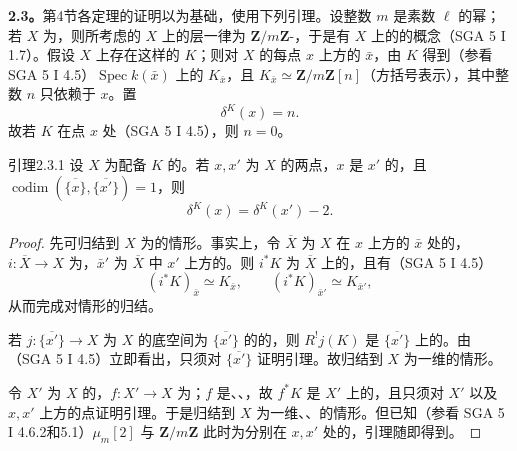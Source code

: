 \textbf{2.3。}第4节各定理的证明以为基础，使用下列引理。设整数 $m$ 是素数 $\ell$ 的幂；若 $X$ 为，则所考虑的 $X$ 上的层一律为 $\mathbf Z/m\mathbf Z$-，于是有 $X$ 上的的概念（SGA 5 I 1.7）。假设 $X$ 上存在这样的 $K$；则对 $X$ 的每点 $x$ 上方的 $\bar x$，由 $K$ 得到（参看 SGA 5 I 4.5）$\operatorname{Spec}k(\bar x)$ 上的 $K_{\bar x}$，且 $K_{\bar x}\simeq\mathbf Z/m\mathbf Z[n]$（方括号表示），其中整数 $n$ 只依赖于 $x$。置
\[\delta^K(x)=n.\]
故若 $K$ 在点 $x$ 处（SGA 5 I 4.5），则 $n=0$。
\begin{SGAresult}{引理}{2.3.1}
设 $X$ 为配备 $K$ 的。若 $x,x'$ 为 $X$ 的两点，$x$ 是 $x'$ 的，且 $\operatorname{codim}(\overline{\{x\}},\overline{\{x'\}})=1$，则
\[\delta^K(x)=\delta^K(x')-2.\]
\end{SGAresult}
\begin{proof}
先可归结到 $X$ 为的情形。事实上，令 $\overline X$ 为 $X$ 在 $x$ 上方的 $\bar x$ 处的，$i:\overline X\to X$ 为，$\bar x'$ 为 $\overline X$ 中 $x'$ 上方的。则 $i^*K$ 为 $\overline X$ 上的，且有（SGA 5 I 4.5）
\[(i^*K)_{\bar x}\simeq K_{\bar x},\qquad(i^*K)_{\bar x'}\simeq K_{\bar x'},\]
从而完成对情形的归结。

若 $j:\overline{\{x'\}}\to X$ 为 $X$ 的底空间为 $\overline{\{x'\}}$ 的的，则 $R^!j(K)$ 是 $\overline{\{x'\}}$ 上的。由（SGA 5 I 4.5）立即看出，只须对 $\overline{\{x'\}}$ 证明引理。故归结到 $X$ 为一维的情形。

令 $X'$ 为 $X$ 的，$f:X'\to X$ 为；$f$ 是、、，故 $f^*K$ 是 $X'$ 上的，且只须对 $X'$ 以及 $x,x'$ 上方的点证明引理。于是归结到 $X$ 为一维、、的情形。但已知（参看 SGA 5 I 4.6.2和5.1）$\mu_m[2]$ 与 $\mathbf Z/m\mathbf Z$ 此时为分别在 $x,x'$ 处的，引理随即得到。
\end{proof}
